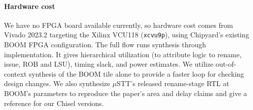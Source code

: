 
\paragraph{Hardware cost}
We have no FPGA board available currently, so hardware cost comes from Vivado 2023.2 targeting the
Xilinx VCU118 (\texttt{xcvu9p}), using Chipyard's existing BOOM FPGA configuration. The full flow 
runs synthesis through implementation. It gives hierarchical utilization (to attribute logic to rename, 
issue, ROB and LSU), timing slack, and power estimates. We utilize out-of-context synthesis of the BOOM 
tile alone to provide a faster loop for checking design changes. We also synthesize $\mu$STT's released 
rename-stage RTL at BOOM's parameters to reproduce the paper's area and delay claims and give a reference 
for our Chisel versions.
